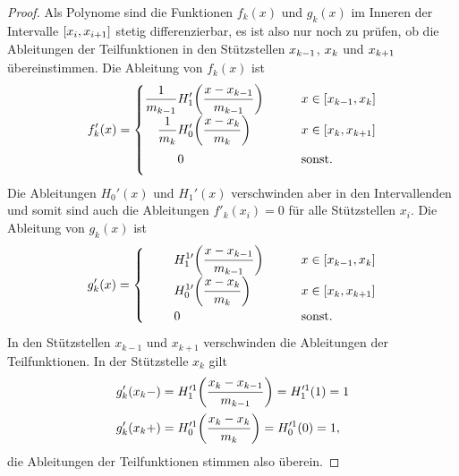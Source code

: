 \begin{proof}
Als Polynome sind die Funktionen $f_k(x)$ und $g_k(x)$ im Inneren der
Intervalle $[x_{i\mathstrut},x_{i+1\mathstrut}]$ stetig
differenzierbar, es ist also nur noch zu prüfen, ob die Ableitungen
der Teilfunktionen in den Stützstellen $x_{k-1\mathstrut}$, $x_{k\mathstrut}$
und $x_{k+1\mathstrut}$ übereinstimmen.
Die Ableitung von $f_k(x)$ ist
\[
f_k'(x)
=
\begin{cases}
\displaystyle
\frac{1}{m_{k-1\mathstrut}}
H'_1\biggl(\frac{x-x_{k-1\mathstrut}}{m_{k-1\mathstrut}}\biggr)
&\qquad x \in [x_{k-1\mathstrut},x_{k\mathstrut}]\\
\displaystyle
\phantom{\frac{1}{m_{k-1\mathstrut}}}
\llap{$\displaystyle\frac{1}{m_{k\mathstrut}}$}
H'_0\biggl(\frac{x-x_{k\mathstrut}}{m_{k\mathstrut}}\biggr)
&\qquad x \in [x_{k\mathstrut},x_{k+1\mathstrut}]\\
\phantom{\displaystyle\frac{1}{m_{k-1\mathstrut}}}
0&\qquad\text{sonst.}
\end{cases}
\]
Die Ableitungen $H_0'(x)$ und $H_1'(x)$ verschwinden aber in den Intervallenden
und somit sind auch die Ableitungen $f'_k(x_i)=0$ für alle Stützstellen $x_i$.
Die Ableitung von $g_k(x)$ ist
\[
g'_k(x)
=
\begin{cases}
\displaystyle
\phantom{m_{k-1}}
H_1^{1\prime}\biggl(\frac{x-x_{k-1\mathstrut}}{m_{k-1\mathstrut}}\biggr)
&\qquad x\in[x_{k-1\mathstrut},x_{k\mathstrut}]\\
\displaystyle
\phantom{m_{k-1}}
H_0^{1\prime}\biggl(\frac{x-x_{k\mathstrut}}{m_{k\mathstrut}}\biggr)
&\qquad x\in[x_{k\mathstrut},x_{k+1\mathstrut}]\\
\displaystyle
\phantom{m_{k-1}}
0
&\qquad\text{sonst.}
\end{cases}
\]
In den Stützstellen $x_{k-1}$ und $x_{k+1}$ verschwinden die Ableitungen
der Teilfunktionen.
In der Stützstelle $x_k$ gilt
\begin{align*}
g_k'(x_k-)
&=
H_1^{\prime 1}\biggl(
\frac{x_{k\mathstrut}-x_{k-1\mathstrut}}{m_{k-1\mathstrut}}
\biggr)
=
H_1^{\prime 1}(1)
=
1
\\
g_k'(x_k+)
&=
H_0^{\prime 1}\biggl(
\frac{x_{k\mathstrut}-x_{k\mathstrut}}{m_{k\mathstrut}}
\biggr)
=
H_0^{\prime 1}(0)
=
1,
\end{align*}
die Ableitungen der Teilfunktionen stimmen also überein.
\end{proof}


%
%

